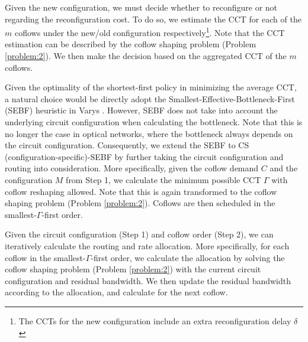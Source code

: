 
Given the new configuration, we must decide whether to reconfigure or not regarding the reconfiguration cost. To do so,
we estimate the CCT for each of the $m$ coflows under the new/old configuration respectively\footnote{The CCTs for the new configuration include an extra reconfiguration delay $\delta$}. Note that the CCT estimation can be described by the coflow shaping problem (Problem \ref{problem:2}).
We then make the decision based on the aggregated CCT of the $m$ coflows.

Given the optimality of the shortest-first policy in
minimizing the average CCT, a natural choice
 would be directly adopt the Smallest-Effective-Bottleneck-First (SEBF) heuristic in Varys \cite{varys}. However, SEBF does not take into account
the underlying circuit configuration when calculating the bottleneck.
Note that this is no longer the case in optical networks, where the bottleneck always depends on the circuit configuration.
Consequently, we extend the SEBF to CS (configuration-specific)-SEBF by further taking the circuit configuration and routing into consideration. More specifically, given the coflow demand $C$ and the configuration $M$ from Step 1, we calculate the minimum possible CCT $\Gamma$ with coflow reshaping allowed. Note that this is again transformed to the coflow shaping problem (Problem \ref{problem:2}). Coflows are then scheduled in the smallest-$\Gamma$-first order.


Given the circuit configuration (Step 1) and coflow order (Step 2), we can iteratively calculate the routing and rate allocation. More specifically, for each coflow in the smallest-$\Gamma$-first order, we calculate the allocation by solving the coflow shaping problem (Problem \ref{problem:2}) with the current circuit configuration and residual bandwidth. We then update the residual bandwidth according to the allocation, and calculate for the next coflow.







